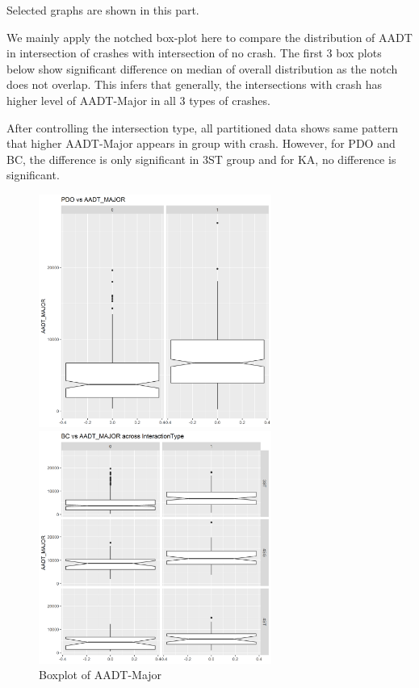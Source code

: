 \documentclass[11pt]{scrartcl} %
\begin{document}
Selected graphs are shown in this part.

We mainly apply the notched box-plot here to compare the distribution of AADT in intersection of crashes with intersection of no crash. The first 3 box plots below show significant difference on median of overall distribution as the notch does not overlap. This infers that generally, the intersections with crash has higher level of AADT-Major in all 3 types of crashes.

After controlling the intersection type, all partitioned data shows same pattern that higher AADT-Major appears in group with crash. However, for PDO and BC, the difference is only significant in 3ST group and for KA, no difference is significant.

\begin{figure}[H]
\begin{minipage}[t]{0.5\linewidth}
\centering
\includegraphics[width=3in]{image/major_all_pdo.png}
\small
\end{minipage}
\begin{minipage}[t]{0.5\linewidth}
\centering
\includegraphics[width=3in]{image/major_bc.png}
\small
\end{minipage}
\caption{Boxplot of AADT-Major}
\end{figure}
\end{document}
